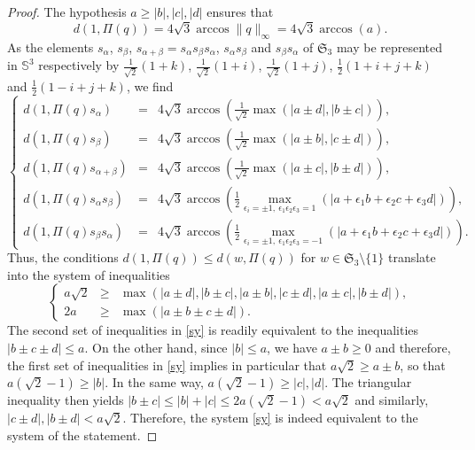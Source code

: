 \documentclass[11pt,twoside]{amsart}
\theoremstyle{plain}
\newcommand{\Sph}{\mathbb{S}}
\newcommand{\Sym}{\mathfrak{S}}
\begin{document}
\begin{proof}
The hypothesis $a\ge|b|,|c|,|d|$ ensures that
\[d(1,\Pi(q))=4\sqrt{3}\arccos\|q\|_\infty=4\sqrt{3}\arccos(a).\]
As the elements $s_\alpha$, $s_\beta$, $s_{\alpha+\beta}=s_\alpha s_\beta s_\alpha$, $s_\alpha s_\beta$ and $s_\beta s_\alpha$ of $\Sym_3$ may be represented in $\Sph^3$ respectively by $\tfrac{1}{\sqrt{2}}(1+k)$, $\tfrac{1}{\sqrt{2}}(1+i)$, $\tfrac{1}{\sqrt{2}}(1+j)$, $\tfrac12(1+i+j+k)$ and $\tfrac12(1-i+j+k)$, we find
\[\left\{\begin{array}{rcl}
d(1,\Pi(q)s_\alpha) & = & 4\sqrt{3}\arccos\left(\tfrac{1}{\sqrt{2}}\max(|a\pm d|,|b\pm c|)\right), \\[.5em]
d(1,\Pi(q)s_\beta) & = & 4\sqrt{3}\arccos\left(\tfrac{1}{\sqrt{2}}\max(|a\pm b|,|c\pm d|)\right), \\[.5em]
d(1,\Pi(q)s_{\alpha+\beta}) & = & 4\sqrt{3}\arccos\left(\tfrac{1}{\sqrt{2}}\max(|a\pm c|,|b\pm d|)\right), \\[.5em]
d(1,\Pi(q)s_\alpha s_\beta) & = & 4\sqrt{3}\arccos\left(\tfrac12\max_{\epsilon_i=\pm1,~\epsilon_1\epsilon_2\epsilon_3=1}(|a+\epsilon_1b+\epsilon_2c+\epsilon_3d|)\right), \\[.5em]
d(1,\Pi(q)s_\beta s_\alpha) & = & 4\sqrt{3}\arccos\left(\tfrac12\max_{\epsilon_i=\pm1,~\epsilon_1\epsilon_2\epsilon_3=-1}(|a+\epsilon_1b+\epsilon_2c+\epsilon_3d|)\right).\end{array}\right.\]
Thus, the conditions $d(1,\Pi(q))\le d(w,\Pi(q))$ for $w\in\Sym_3\setminus\{1\}$ translate into the system of inequalities
\begin{equation}\label{sy}\tag{$S$}
\left\{\begin{array}{rcl}
a\sqrt{2} & \ge & \max(|a\pm d|,|b\pm c|,|a\pm b|,|c\pm d|,|a\pm c|,|b\pm d|), \\[.5em]
2a & \ge & \max(|a\pm b\pm c\pm d|).\end{array}\right.
\end{equation}
The second set of inequalities in \eqref{sy} is readily equivalent to the inequalities $|b\pm c\pm d|\le a$. On the other hand, since $|b|\le a$, we have $a\pm b\ge 0$ and therefore, the first set of inequalities in \eqref{sy} implies in particular that $a\sqrt{2}\ge a\pm b$, so that $a(\sqrt{2}-1)\ge |b|$. In the same way, $a(\sqrt{2}-1)\ge |c|,|d|$. The triangular inequality then yields $|b\pm c|\le|b|+|c|\le 2a(\sqrt{2}-1)<a\sqrt{2}$ and similarly, $|c\pm d|,|b\pm d|<a\sqrt{2}$. Therefore, the system \eqref{sy} is indeed equivalent to the system of the statement.


\end{proof}
\end{document}
